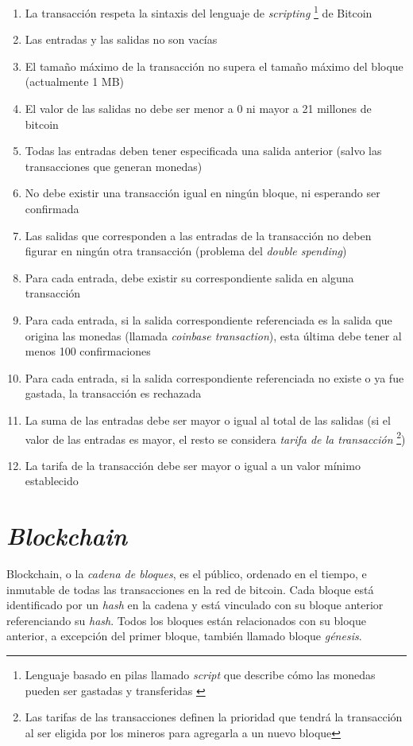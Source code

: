 \begin{enumerate}
    \item La transacción respeta la sintaxis del lenguaje de \emph{scripting} \footnote{Lenguaje basado en pilas llamado \emph{script} que describe cómo las monedas pueden ser gastadas y transferidas \autocite{MasteringBlockchainScript}} de Bitcoin 
    \item Las entradas y las salidas no son vacías
    \item El tamaño máximo de la transacción no supera el tamaño máximo del bloque (actualmente 1 MB)
    \item El valor de las salidas no debe ser menor a 0 ni mayor a 21 millones de bitcoin
    \item Todas las entradas deben tener especificada una salida anterior (salvo las transacciones que generan monedas)
    \item No debe existir una transacción igual en ningún bloque, ni esperando ser confirmada
    \item Las salidas que corresponden a las entradas de la transacción no deben figurar en ningún otra transacción (problema del \emph{double spending})
    \item Para cada entrada, debe existir su correspondiente salida en alguna transacción
    \item Para cada entrada, si la salida correspondiente referenciada es la salida que origina las monedas (llamada \emph{coinbase transaction}), esta última debe tener al menos 100 confirmaciones
    \item Para cada entrada, si la salida correspondiente referenciada no existe o ya fue gastada, la transacción es rechazada
    \item La suma de las entradas debe ser mayor o igual al total de las salidas (si el valor de las entradas es mayor, el resto se considera \emph{tarifa de la transacción} \footnote{Las tarifas de las transacciones definen la prioridad que tendrá la transacción al ser eligida por los mineros para agregarla a un nuevo bloque})
    \item La tarifa de la transacción debe ser mayor o igual a un valor mínimo establecido
\end{enumerate}

\section{\emph{Blockchain}}

Blockchain, o la \emph{cadena de bloques}, es el  público, ordenado en el tiempo, e inmutable de todas las transacciones en la red de bitcoin. Cada bloque está identificado por un \emph{hash} en la cadena y está vinculado con su bloque anterior referenciando su \emph{hash}. Todos los bloques están relacionados con su bloque anterior, a excepción del primer bloque, también llamado bloque \emph{génesis}. 

